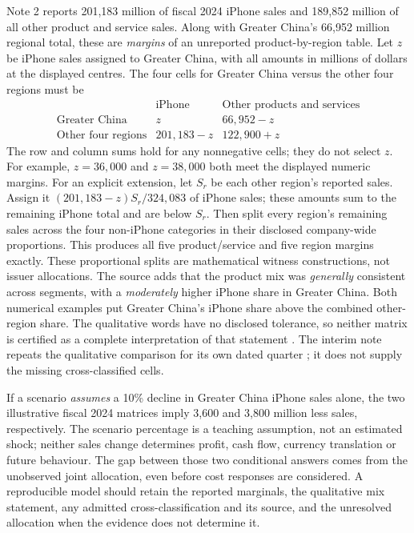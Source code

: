 Note 2 reports 201,183 million of fiscal 2024 iPhone sales and 189,852
million of all other product and service sales. Along with Greater China's
66,952 million regional total, these are \emph{margins} of an unreported
product-by-region table. Let $z$ be iPhone sales assigned to Greater China,
with all amounts in millions of dollars at the displayed centres. The four
cells for Greater China versus the other four regions must be
\begin{equation}
\begin{array}{c|cc}
 &\text{iPhone}&\text{Other products and services}\\\hline
\text{Greater China}&z&66{,}952-z\\
\text{Other four regions}&201{,}183-z&122{,}900+z
\end{array}
\label{eq:apple-product-region-margins}
\end{equation}
The row and column sums hold for any nonnegative cells; they do not select
$z$. For example, $z=36{,}000$ and $z=38{,}000$ both meet the displayed
numeric margins. For an explicit extension, let $S_r$ be each other region's
reported sales. Assign it $(201{,}183-z)S_r/324{,}083$ of iPhone sales;
these amounts sum to the remaining iPhone total and are below $S_r$.
Then split every region's remaining sales across the four non-iPhone categories
in their disclosed company-wide proportions. This produces all five
product/service and five region margins exactly. These proportional splits
are mathematical witness constructions, not issuer allocations. The source adds that the product mix
was \emph{generally} consistent across segments, with a \emph{moderately}
higher iPhone share in Greater China. Both numerical examples put Greater
China's iPhone share above the combined other-region share. The qualitative
words have no disclosed tolerance, so neither matrix is certified as a
complete interpretation of that statement
\citep[Note 2, printed pp.~35--36]{apple2024}. The interim note repeats the
qualitative comparison for its own dated quarter
\citep[Note 2, printed p.~6]{apple2025q1}; it does not supply the missing
cross-classified cells.

If a scenario \emph{assumes} a 10\% decline in Greater China iPhone sales
alone, the two illustrative fiscal 2024 matrices imply 3,600 and 3,800
million less sales, respectively. The scenario percentage is a teaching
assumption, not an estimated shock; neither sales change determines profit,
cash flow, currency translation or future behaviour. The gap between those
two conditional answers comes from the unobserved joint allocation, even
before cost responses are considered. A reproducible model should retain
the reported marginals, the qualitative mix statement, any admitted
cross-classification and its source, and the unresolved allocation when
the evidence does not determine it.

